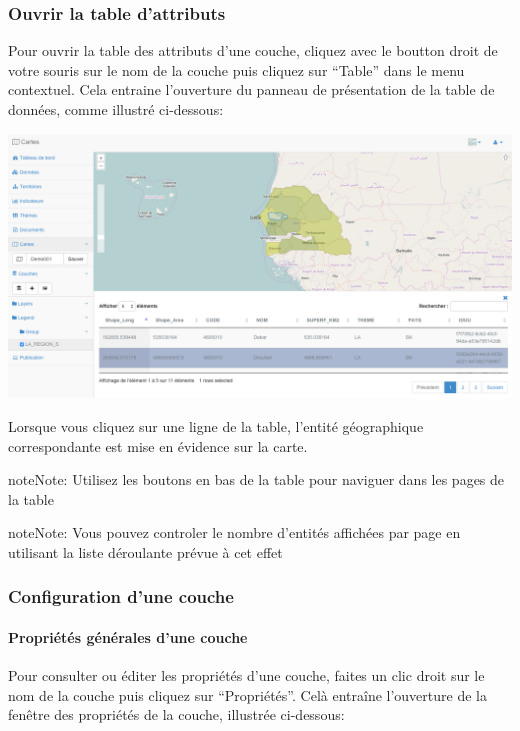 \documentclass[letterpaper,10pt,french]{sphinxmanual}
\begin{document}
\subsubsection{Ouvrir la table d'attributs}
\label{maps/layerstree:ouvrir-la-table-d-attributs}
Pour ouvrir la table des attributs d'une couche, cliquez avec le
boutton droit de votre souris sur le nom de la couche puis cliquez sur
``Table'' dans le menu contextuel. Cela entraine l'ouverture du panneau
de présentation de la table de données, comme illustré ci-dessous:

\includegraphics[width=1.000\linewidth]{view-table-window.png}

Lorsque vous cliquez sur une ligne de la table, l'entité géographique
correspondante est mise en évidence sur la carte.

\begin{notice}{note}{Note:}
Utilisez les boutons en bas de la table pour naviguer dans les pages de la table
\end{notice}

\begin{notice}{note}{Note:}
Vous pouvez controler le nombre d'entités affichées par page en utilisant la liste déroulante prévue à cet effet
\end{notice}


\subsubsection{Configuration d'une couche}
\label{maps/layerstree:configuration-d-une-couche}

\paragraph{Propriétés générales d'une couche}
\label{maps/layerstree:proprietes-generales-d-une-couche}
Pour consulter ou éditer les propriétés d'une couche, faites un clic droit sur le nom de la couche puis cliquez sur ``Propriétés''. Celà entraîne l'ouverture de la fenêtre des propriétés de la couche, illustrée ci-dessous:
\end{document}
